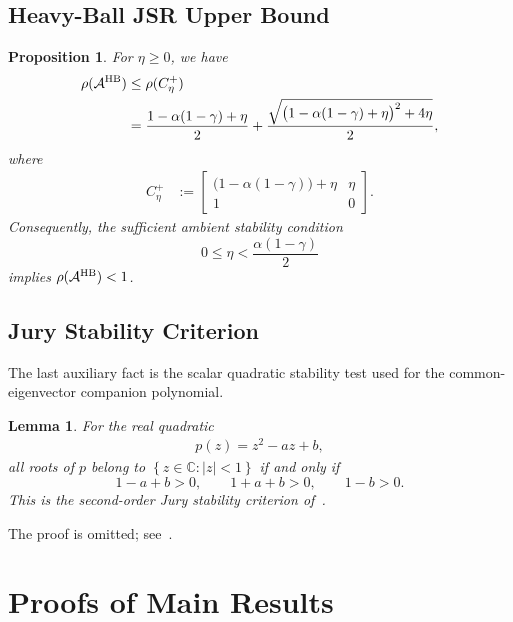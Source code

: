 \documentclass[letterpaper]{article}
\numberwithin{equation}{section}
\newtheorem{proposition}{Proposition}[section]
\newtheorem{lemma}{Lemma}[section]
\begin{document}
\subsection{Heavy-Ball JSR Upper Bound}
\label{app:hb-jsr-upper-bound}

\begin{proposition}
\label{prop:hb-jsr-upper-bound}
For $\eta\ge0$, we have
\begin{align*}
\rho(\mathcal A^{\rm HB})
&\le \rho(C_\eta^+)\\
&=\frac{1-\alpha(1-\gamma)+\eta}{2} + \frac{\sqrt{\bigl(1-\alpha(1-\gamma)+\eta\bigr)^2+4\eta}}{2},
\end{align*}
where
\begin{align*}
  C_\eta^+&:=
  \begin{bmatrix}
    \bigl(1-\alpha(1-\gamma)\bigr)+\eta&\eta\\
    1&0
  \end{bmatrix}.
\end{align*}
Consequently, the sufficient ambient stability condition
\begin{equation}
  0\le \eta<\frac{\alpha(1-\gamma)}{2}
  \label{eq:hb-simple-stability-sufficient}
\end{equation}
implies $\rho(\mathcal A^{\rm HB})<1$.
\end{proposition}

\subsection{Jury Stability Criterion}
\label{app:jury-stability-criterion}

The last auxiliary fact is the scalar quadratic stability test used for the
common-eigenvector companion polynomial.
\begin{lemma}
\label{lem:jury-quadratic}
For the real quadratic
\begin{align*}
  p(z)=z^2-az+b,
\end{align*}
all roots of $p$ belong to $\left\{z\in\mathbb C:|z|<1\right\}$ if and only if
\begin{equation*}
  1-a+b>0,
  \qquad
  1+a+b>0,
  \qquad
  1-b>0.
\end{equation*}
This is the second-order Jury stability criterion of~\citet{jury1962simplified}.
\end{lemma}

The proof is omitted; see~\citet{jury1962simplified}.

\section{Proofs of Main Results}
\label{app:proofs-main-results}
\end{document}
